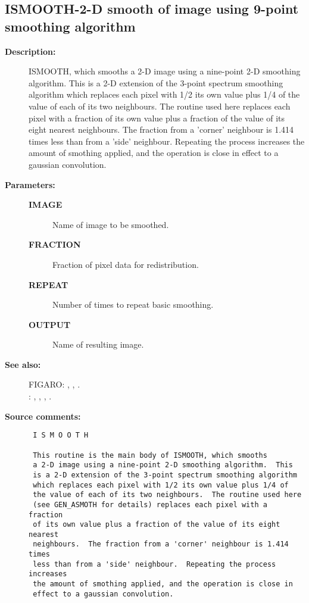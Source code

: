 \subsection{ISMOOTH-\label{ISMOOTH}2-D smooth of image using 9-point smoothing algorithm}
\begin{description}

\item [{\bf Description:}]
 ISMOOTH, which smooths a 2-D image using a nine-point 2-D
 smoothing algorithm.  This is a 2-D extension of the 3-point
 spectrum smoothing algorithm which replaces each pixel with
 1/2 its own value plus 1/4 of the value of each of its two
 neighbours.  The routine used here replaces each pixel with
 a fraction of its own value plus a fraction of the value of
 its eight nearest neighbours.  The fraction from a 'corner'
 neighbour is 1.414 times less than from a 'side' neighbour.
 Repeating the process increases the amount of smothing applied,
 and the operation is close in effect to a gaussian convolution.

\item [{\bf Parameters:}]
\begin{description}
\item [{\bf IMAGE}]
 Name of image to be smoothed.
\item [{\bf FRACTION}]
 Fraction of pixel data for redistribution.
\item [{\bf REPEAT}]
 Number of times to repeat basic smoothing.
\item [{\bf OUTPUT}]
 Name of resulting image.
\end{description}

\item [{\bf See also:}]
FIGARO: , , .\\
: , , , .\\

\item [{\bf Source comments:}]
\begin{verbatim}
 I S M O O T H

 This routine is the main body of ISMOOTH, which smooths
 a 2-D image using a nine-point 2-D smoothing algorithm.  This
 is a 2-D extension of the 3-point spectrum smoothing algorithm
 which replaces each pixel with 1/2 its own value plus 1/4 of
 the value of each of its two neighbours.  The routine used here
 (see GEN_ASMOTH for details) replaces each pixel with a fraction
 of its own value plus a fraction of the value of its eight nearest
 neighbours.  The fraction from a 'corner' neighbour is 1.414 times
 less than from a 'side' neighbour.  Repeating the process increases
 the amount of smothing applied, and the operation is close in
 effect to a gaussian convolution.


\end{verbatim}
\end{description}
